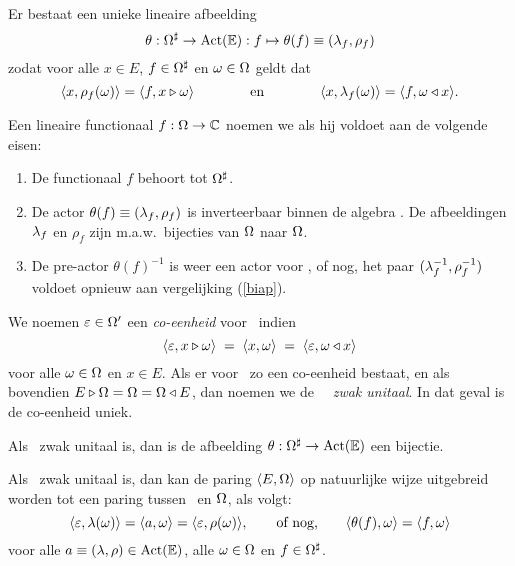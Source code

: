 \documentclass{book}
\begin{document}
\begin{prop} \label{prop:induced_actor}
Er bestaat een unieke lineaire afbeelding
$$\theta: \Om\adl \rarr \ActE: f \mapsto \theta(f)\equiv\lamrho{f} $$
zodat voor alle\/ $x\in E$, $f \in \Om\adl$ en\/ $\om \in \Om$ geldt dat\/
$$\pair{x}{\rho_f(\om)} = \pair{f}{x \lact \om}
  \andspace{4em}
  \pair{x}{\lam_f(\om)} = \pair{f}{\om \ract x}.$$
\end{prop}


\begin{defn}\label{def:EEinvertible} \rm
Een lineaire functionaal $f:\Om\rarr \kk$ noemen we  als
hij voldoet aan de volgende eisen:
\begin{enumerate}
\item
De functionaal $f$ behoort tot $\Om\adl$.
\item
De actor $\theta(f)\equiv\lamrho{f}$ is inverteerbaar binnen de algebra \PreE\@.
De afbeeldingen $\lam_f$ en $\rho_f$ zijn m.a.w.\ bijecties van $\Om$ naar $\Om$.
\item
De pre-actor $\theta(f)^{-1}$ is weer een actor voor \EE, of nog,
het paar $(\lam_f^{-1},\rho_f^{-1})$ voldoet opnieuw aan vergelijking (\ref{biap}).
\end{enumerate}
\end{defn}


\begin{defn} \rm
We noemen $\eps \in \Om'$ een {\em co-eenheid\/} voor \EE\ indien
$$ \pair{\eps}{x\lact\om}    \;=\;  \pair{x}{\om}  \;=\;   \pair{\eps}{\om \ract x} $$
voor alle $\om \in \Om$ en $x\in E$.
Als er voor \EE\ zo een co-eenheid bestaat, en als bovendien
$E \lact \Om = \Om = \Om \ract E$, dan noemen we de \context\ \EE\ {\em zwak unitaal}\@.
In dat geval is de co-eenheid uniek.
\end{defn}


\begin{prop} \label{prop:theta:bijectie}
Als\/ \EE\ zwak unitaal is, dan is de afbeelding\/ $\theta: \Om\adl \rarr \ActE$ een bijectie.
\end{prop}

\begin{cor}
Als\/ \EE\ zwak unitaal is, dan kan de paring $\pair{E}{\Om}$ op natuurlijke
wijze uitgebreid worden tot een paring tussen\/ \ActE\ en\/ $\Om$, als volgt:
$$ \pair{\eps}{\lam(\om)} = \pair{a}{\om} = \pair{\eps}{\rho(\om)},
           \hspace{2em} \mbox{of nog,} \hspace{2em}
     \pair{\theta(f)}{\om} = \pair{f}{\om}  $$
voor alle\/ $a\equiv(\lam,\rho)\in \ActE$, alle\/ $\om\in\Om$ en $f\in\Om\adl$.
\end{cor}
\end{document}
